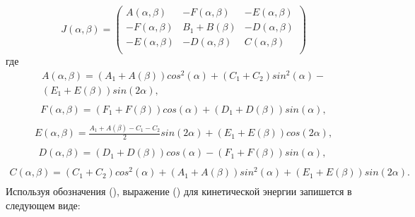 \begin{equation} %
\label{eq:p3:24}
J \left( \alpha, \beta \right) = \left( \begin{matrix}
A \left( \alpha, \beta \right) & -F \left( \alpha, \beta \right) & -E \left( \alpha, \beta \right) \\
-F \left( \alpha, \beta \right) & B_{1}+B \left( \beta \right) & -D \left( \alpha, \beta \right) \\
-E \left( \alpha, \beta \right) & -D \left( \alpha, \beta \right) & C \left( \alpha, \beta \right) \\
\end{matrix}
\right) 
\end{equation}
где 
\begin{equation}
\begin{multlined}
 A ( \alpha, \beta ) = 
 ( A_{1}+A ( \beta ) ) cos^{2} ( \alpha ) + 
 ( C_{1}+C_{2} ) sin^{2} ( \alpha ) - \nonumber \\
 ( E_{1}+E ( \beta ) ) sin ( 2 \alpha ),\nonumber \\
\end{multlined}
\end{equation}
\begin{equation}
\begin{multlined}
 F \left( \alpha, \beta \right) = \left( F_{1}+F \left( \beta \right) \right) cos \left( \alpha \right) + \left( D_{1}+D \left( \beta \right) \right) sin \left( \alpha \right),\nonumber \\
\end{multlined}
\end{equation}
\begin{equation}
\begin{multlined}
 E \left( \alpha, \beta \right) =\frac{A_{1}+A \left( \beta \right) -C_{1}-C_{2}}{2}sin \left( 2 \alpha \right) + \left( E_{1}+E \left( \beta \right) \right) cos \left( 2 \alpha \right),\nonumber \\
\end{multlined}
\end{equation}
\begin{equation}
\begin{multlined}
 D \left( \alpha, \beta \right) = \left( D_{1}+D \left( \beta \right) \right) cos \left( \alpha \right) - \left( F_{1}+F \left( \beta \right) \right) sin \left( \alpha \right),\ \nonumber \\
\end{multlined}
\end{equation}
\begin{equation}
\begin{multlined}
 C \left( \alpha, \beta \right) = \left( C_{1}+C_{2} \right) cos^{2} \left( \alpha \right) + \left( A_{1}+A \left( \beta \right) \right) sin^{2} \left( \alpha \right) + \left( E_{1}+E \left( \beta \right) \right) sin \left( 2 \alpha \right) . \nonumber \\
\end{multlined}
\end{equation}
Используя обозначения (), выражение () для кинетической энергии запишется в следующем виде: 


